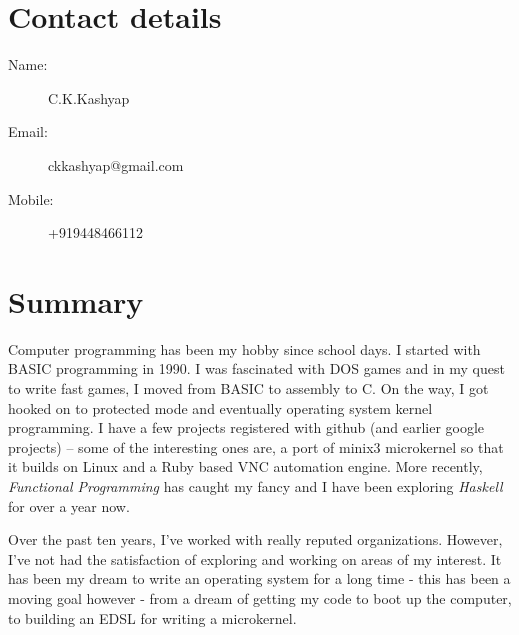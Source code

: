 \documentclass [a4paper,11pt] {article}
\begin{document}
\section*{Contact details}
\begin{description}
\item[Name:] C.K.Kashyap
\item[Email:] ckkashyap@gmail.com
\item[Mobile:] +919448466112
\end{description}

\section*{Summary}
Computer programming has been my hobby since school days. I started with BASIC
programming in 1990. I was fascinated with DOS games and in my quest to write
fast games, I moved from BASIC to assembly to C. On the way, I got hooked on to
protected mode and eventually operating system kernel programming. I have a few
projects registered with github (and earlier google projects) –  some of the
interesting ones are, a port of minix3 microkernel so that it builds on Linux
and a Ruby based VNC automation engine. More recently, {\it Functional Programming}
has caught my fancy and I have been exploring {\it Haskell} for over a year now.

Over the past ten years, I've worked with really reputed organizations.
However, I've not had the satisfaction of exploring and working on areas of my
interest. It has been my dream to write an operating system for a long time -
this has been a moving goal however - from a dream of getting my code to boot
up the computer, to building an EDSL for writing a microkernel.
\end{document}
